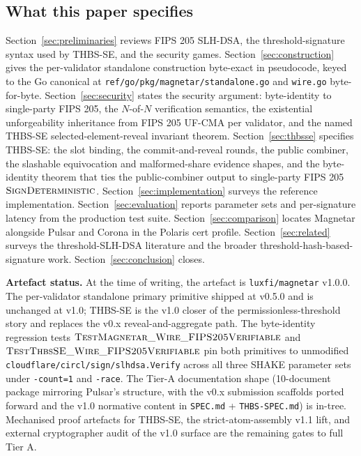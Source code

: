 \subsection{What this paper specifies}
\label{sec:intro:paper}

Section~\ref{sec:preliminaries} reviews FIPS 205 SLH-DSA, the
threshold-signature syntax used by THBS-SE, and the security
games. Section~\ref{sec:construction} gives the per-validator
standalone construction byte-exact in pseudocode, keyed to the Go
canonical at \texttt{ref/go/pkg/magnetar/standalone.go} and
\texttt{wire.go} byte-for-byte. Section~\ref{sec:security} states
the security argument: byte-identity to single-party FIPS 205, the
$N$-of-$N$ verification semantics, the existential unforgeability
inheritance from FIPS 205 UF-CMA per validator, and the named
THBS-SE selected-element-reveal invariant theorem.
Section~\ref{sec:thbsse} specifies THBS-SE: the slot binding, the
commit-and-reveal rounds, the public combiner, the slashable
equivocation and malformed-share evidence shapes, and the
byte-identity theorem that ties the public-combiner output to
single-party FIPS 205 $\textsc{SignDeterministic}$.
Section~\ref{sec:implementation} surveys the reference
implementation. Section~\ref{sec:evaluation} reports parameter sets
and per-signature latency from the production test suite.
Section~\ref{sec:comparison} locates Magnetar alongside Pulsar and
Corona in the Polaris cert profile.
Section~\ref{sec:related} surveys the threshold-SLH-DSA literature
and the broader threshold-hash-based-signature work.
Section~\ref{sec:conclusion} closes.

\medskip\noindent\textbf{Artefact status.} At the time of writing,
the artefact is \texttt{luxfi/magnetar} v1.0.0. The per-validator
standalone primary primitive shipped at v0.5.0 and is unchanged at
v1.0; THBS-SE is the v1.0 closer of the permissionless-threshold
story and replaces the v0.x reveal-and-aggregate path. The
byte-identity regression tests
$\textsc{TestMagnetar\_Wire\_FIPS205Verifiable}$ and
$\textsc{TestThbsSE\_Wire\_FIPS205Verifiable}$ pin both primitives
to unmodified \texttt{cloudflare/circl/sign/slhdsa.Verify} across
all three SHAKE parameter sets under \texttt{-count=1} and
\texttt{-race}. The Tier-A documentation shape (10-document package
mirroring Pulsar's structure, with the v0.x submission scaffolds
ported forward and the v1.0 normative content in
\texttt{SPEC.md} + \texttt{THBS-SPEC.md}) is in-tree. Mechanised
proof artefacts for THBS-SE, the strict-atom-assembly v1.1 lift,
and external cryptographer audit of the v1.0 surface are the
remaining gates to full Tier A.
